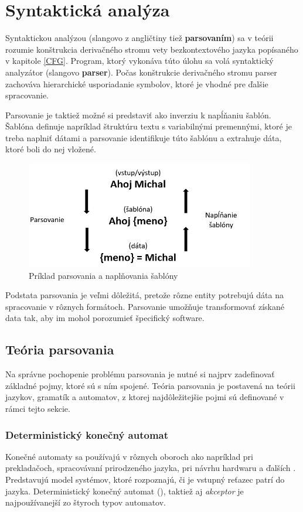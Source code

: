 \chapter{Syntaktická analýza}
Syntaktickou analýzou (slangovo z angličtiny tiež \textbf{parsovaním}) sa v teórii rozumie konštrukcia derivačného stromu vety bezkontextového jazyka\cite{CVUT:program_language} popísaného v kapitole \ref{CFG}. Program, ktorý vykonáva túto úlohu sa volá syntaktický analyzátor (slangovo \textbf{parser}). Počas konštrukcie derivačného stromu parser zachováva hierarchické usporiadanie symbolov, ktoré je vhodné pre ďalšie spracovanie.

Parsovanie je taktiež možné si predstaviť ako inverziu k napĺňaniu šablón. Šablóna definuje napríklad štruktúru textu s variabilnými premennými, ktoré je treba naplniť dátami a parsovanie identifikuje túto šablónu a extrahuje dáta, ktoré boli do nej vložené.

\begin{figure}[H]
\begin{center}
\includegraphics[width=10cm]{figures/templatingAndParsing.PNG}
\caption{Príklad parsovania a naplňovania šablóny}
\label{fig:templatingAndParsing}
\end{center}
\end{figure}

Podstata parsovania je veľmi dôležitá, pretože rôzne entity potrebujú dáta na spracovanie v rôznych formátoch. Parsovanie umožňuje transformovať získané data tak, aby im mohol porozumieť špecifický software. 

\section{Teória parsovania}
Na správne pochopenie problému parsovania je nutné si najprv zadefinovať základné pojmy, ktoré sú s ním spojené. Teória parsovania je postavená na teórii jazykov, gramatík a automatov, z ktorej najdôležitejšie pojmi sú definované v rámci tejto sekcie.

\subsection{Deterministický konečný automat}\label{DFA}
Konečné automaty sa používajú v rôznych oboroch ako napríklad pri prekladačoch, spracovávaní prirodzeného jazyka, pri návrhu hardwaru a ďalších \cite{demlova:automaty}. Predstavujú model systémov, ktoré rozpoznajú, či je vstupný reťazec patrí do jazyka. Deterministický konečný automat (), taktiež aj \textit{akceptor} je najpoužívanejší zo štyroch typov automatov.

